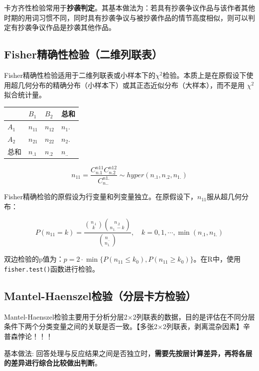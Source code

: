 \documentclass[
]{book}
\begin{document}
卡方齐性检验常用于\textbf{抄袭判定}。其基本做法为：若具有抄袭争议作品与该作者其他时期的用词习惯不同，同时具有抄袭争议与被抄袭作品的情节高度相似，则可以判定有抄袭争议作品是抄袭其他作品。

\subsection{Fisher精确性检验（二维列联表）}\label{fisherux7cbeux786eux6027ux68c0ux9a8cux4e8cux7ef4ux5217ux8054ux8868}

Fisher精确性检验适用于二维列联表或小样本下的\(\chi^2\)检验。本质上是在原假设下使用超几何分布的精确分布（小样本下）或其正态近似分布（大样本），而不是用 \(\chi^2\) 拟合统计量。

\begin{longtable}[]{@{}llll@{}}
\toprule\noalign{}
& \(B_1\) & \(B_2\) & 总和 \\
\midrule\noalign{}
\endhead
\bottomrule\noalign{}
\endlastfoot
\(A_1\) & \(n_{11}\) & \(n_{12}\) & \(n_1.\) \\
\(A_2\) & \(n_{21}\) & \(n_{22}\) & \(n_2.\) \\
总和 & \(n_{.1}\) & \(n_{.2}\) & \(n_{..}\) \\
\end{longtable}

\[
n_{11}= \frac{C_{n.1}^{n11}C_{n.2}^{n12}}{C_{n..}^{n1.}} \sim hyper(n_{.1},n_{.2},n_{1.})
\]

Fisher精确检验的原假设为行变量和列变量独立。在原假设下，\(n_{11}\)服从超几何分布：

\[P(n_{11} = k) = \frac{\binom{n_{.1}}{k}\binom{n_{.2}}{n_{1.} - k}}{\binom{n_{..}}{n_{1.}}}, \quad k = 0, 1, \cdots, \min(n_{.1}, n_{1.})\]

双边检验的p值为：\(p = 2 \cdot \min\{P(n_{11} \leq k_0), P(n_{11} \geq k_0)\}\)。在R中，使用\texttt{fisher.test()}函数进行检验。

\subsection{Mantel-Haenszel检验（分层卡方检验）}\label{mantel-haenszelux68c0ux9a8cux5206ux5c42ux5361ux65b9ux68c0ux9a8c}

Mantel-Haenszel检验主要用于分析分层2×2列联表的数据，目的是评估在不同分层条件下两个分类变量之间的关联是否一致。【多张2×2列联表，剥离混杂因素】辛普森悖论！！！

基本做法: 回答处理与反应结果之间是否独立时，\textbf{需要先按层计算差异，再将各层的差异进行综合比较做出判断}。
\end{document}
